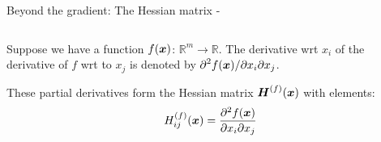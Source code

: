 \begin{frame}[t,allowframebreaks]{
    Beyond the gradient: The Hessian matrix -}
\begin{columns}
\begin{column}{0.58\textwidth}
        \end{column}
    \end{columns}

    \framebreak

   
    Suppose we have a function 
    $f(\boldsymbol{x})$: $\mathbb{R}^m \rightarrow \mathbb{R}$.
    The derivative wrt $x_i$ of the derivative of $f$ wrt to $x_j$ 
    is denoted by $\displaystyle \partial^2 f(\boldsymbol{x}) / \partial x_i \partial x_j$.\\        
    \vspace{0.1cm}

    These partial derivatives form the \gls{Hessian matrix} 
    $\boldsymbol{H}^{(f)}(\boldsymbol{x})$ with elements:
    \begin{equation}
        H^{(f)}_{ij}(\boldsymbol{x}) = 
        \frac{\partial^2 f(\boldsymbol{x})}{\partial x_i \partial x_j}
        \label{eq:hessian_1}
    \end{equation}\\
    

\end{frame}
